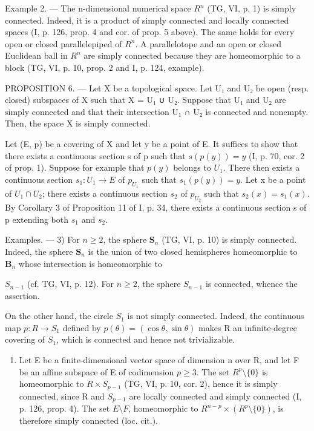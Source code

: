 Example 2. --- The n-dimensional numerical space \(R^{n}\) (TG, VI, p. 1) is simply connected. Indeed, it is a product of simply connected and locally connected spaces (I, p. 126, prop. 4 and cor. of prop. 5 above). The same holds for every open or closed parallelepiped of \(R^{n}\). A parallelotope and an open or closed Euclidean ball in \(R^{n}\) are simply connected because they are homeomorphic to a block (TG, VI, p. 10, prop. 2 and I, p. 124, example).

PROPOSITION 6. --- Let X be a topological space. Let U₁ and U₂ be open (resp. closed) subspaces of X such that X = U₁ ∪ U₂. Suppose that U₁ and U₂ are simply connected and that their intersection U₁ ∩ U₂ is connected and nonempty. Then, the space X is simply connected.

Let (E, p) be a covering of X and let y be a point of E. It suffices to show that there exists a continuous section s of p such that \(s(p(y)) = y\) (I, p. 70, cor. 2 of prop. 1). Suppose for example that \(p(y)\) belongs to \(U_{1}\). There then exists a continuous section \(s_{1}: U_{1} \to E\) of \(p_{U_{1}}\) such that \(s_{1}(p(y)) = y\). Let x be a point of \(U_{1} \cap U_{2}\); there exists a continuous section \(s_{2}\) of \(p_{U_{2}}\) such that \(s_{2}(x) = s_{1}(x)\). By Corollary 3 of Proposition 11 of I, p. 34, there exists a continuous section s of p extending both \(s_{1}\) and \(s_{2}\).

Examples. --- 3) For \(n \geqslant 2\), the sphere \(\mathbf{S}_{n}\) (TG, VI, p. 10) is simply connected. Indeed, the sphere \(\mathbf{S}_{n}\) is the union of two closed hemispheres homeomorphic to \(\mathbf{B}_{n}\) whose intersection is homeomorphic to

\(S_{n-1}\) (cf. TG, VI, p. 12). For \(n \geqslant 2\), the sphere \(S_{n-1}\) is connected, whence the assertion.

On the other hand, the circle \(S_{1}\) is not simply connected. Indeed, the continuous map \(p: R \to S_{1}\) defined by \(p(\theta) = (\cos \theta, \sin \theta)\) makes R an infinite-degree covering of \(S_{1}\), which is connected and hence not trivializable.

\begin{enumerate}
\def\labelenumi{\arabic{enumi})}
\setcounter{enumi}{3}
\tightlist
\item
  Let E be a finite-dimensional vector space of dimension n over R, and let F be an affine subspace of E of codimension \(p \geqslant 3\). The set \(R^{p}\setminus\{0\}\) is homeomorphic to \(R \times S_{p-1}\) (TG, VI, p. 10, cor. 2), hence it is simply connected, since R and \(S_{p-1}\) are locally connected and simply connected (I, p. 126, prop. 4). The set \(E\setminus F\), homeomorphic to \(R^{n-p} \times (R^{p}\setminus\{0\})\), is therefore simply connected (loc. cit.).
\end{enumerate}

